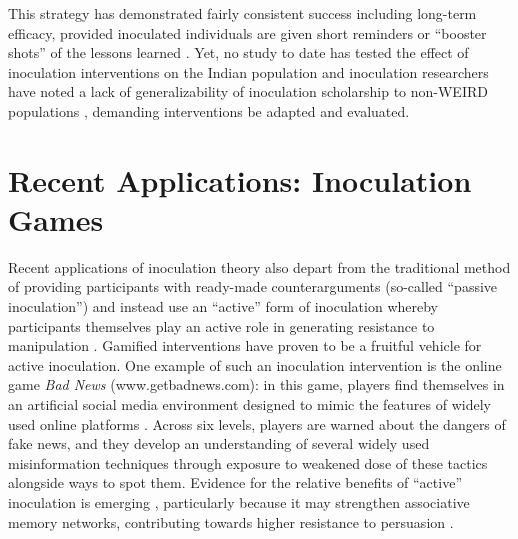 \documentclass[empirical, authordate, issue]{jote-new-article}
\begin{document}
This strategy has demonstrated fairly consistent success \parencite{Basol2020, Cook2017, Roozenbeek2019} including long-term efficacy, provided inoculated individuals are given short reminders or “booster shots” of the lessons learned \parencite{Maertens2021}. Yet, no study to date has tested the effect of inoculation interventions on the Indian population and inoculation researchers have noted a lack of generalizability of inoculation scholarship to non-WEIRD populations \parencite{Bonetto2018}, demanding interventions be adapted and evaluated.

\section{Recent Applications: Inoculation Games}

Recent applications of inoculation theory also depart from the traditional method of providing participants with ready-made counterarguments (so-called “passive inoculation”) and instead use an “active” form of inoculation whereby participants themselves\textbf{ }play an active role in generating resistance to manipulation \parencite{Roozenbeek2018}. Gamified interventions have proven to be a fruitful vehicle for active inoculation. One example of such an inoculation intervention is the online game \emph{Bad News }(www.getbadnews.com): in this game, players find themselves in an artificial social media environment designed to mimic the features of widely used online platforms \parencite{Basol2020, Maertens2021, Roozenbeek2021, Roozenbeek2019}. Across six levels, players are warned about the dangers of fake news, and they develop an understanding of several widely used misinformation techniques through exposure to weakened dose of these tactics alongside ways to spot them. Evidence for the relative benefits of “active” inoculation is emerging \parencite{Basol2021}, particularly because it may strengthen associative memory networks, contributing towards higher resistance to persuasion \parencite{Pfau2005}.
\end{document}
